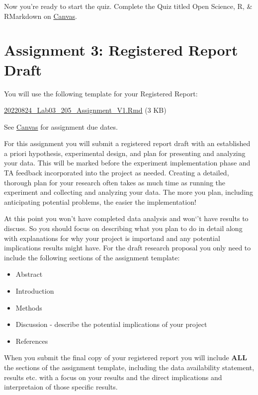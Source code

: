 \documentclass[
]{book}
\providecommand{\tightlist}{%
  \setlength{\itemsep}{0pt}\setlength{\parskip}{0pt}}
\begin{document}
Now you're ready to start the quiz. Complete the Quiz titled Open Science, R, \& RMarkdown on \href{https://canvas.ubc.ca/courses/98621}{Canvas}.

\hypertarget{assignment-3-registered-report-draft}{%
\chapter*{Assignment 3: Registered Report Draft}\label{assignment-3-registered-report-draft}}

You will use the following template for your Registered Report:

\href{}{20220824\_Lab03\_205\_Assignment\_V1.Rmd} (3 KB)

See \href{https://canvas.ubc.ca}{Canvas} for assignment due dates.

For this assignment you will submit a registered report draft with an established a priori hypothesis, experimental design, and plan for presenting and analyzing your data. This will be marked before the experiment implementation phase and TA feedback incorporated into the project as needed. Creating a detailed, thorough plan for your research often takes as much time as running the experiment and collecting and analyzing your data. The more you plan, including anticipating potential problems, the easier the implementation!

At this point you won't have completed data analysis and won`'t have results to discuss. So you should focus on describing what you plan to do in detail along with explanations for why your project is importand and any potential implications results might have. For the draft research proposal you only need to include the following sections of the assignment template:

\begin{itemize}
\tightlist
\item
  Abstract
\item
  Introduction
\item
  Methods
\item
  Discussion - describe the potential implications of your project
\item
  References
\end{itemize}

When you submit the final copy of your registered report you will include \textbf{ALL} the sections of the assignment template, including the data availability statement, results etc. with a focus on your results and the direct implications and interpretaion of those specific results.
\end{document}

